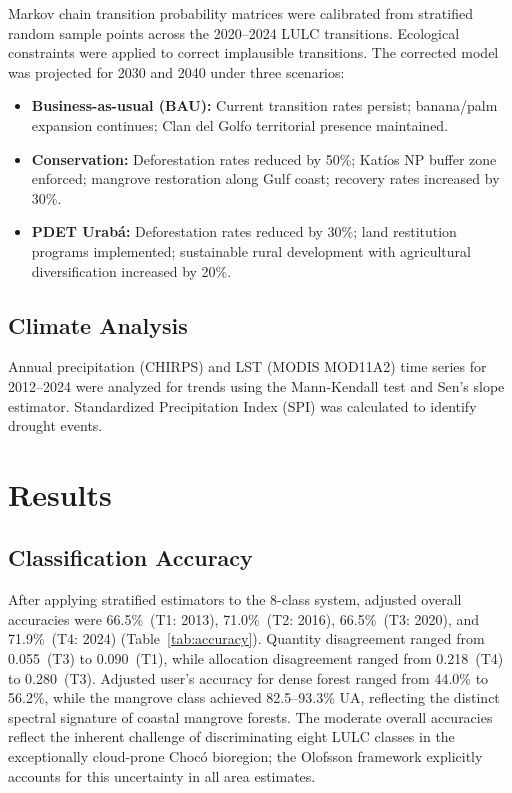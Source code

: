 \documentclass[12pt,a4paper]{article}
\begin{document}
Markov chain transition probability matrices \citep{Halmy2015} were calibrated from stratified random sample points across the 2020--2024 LULC transitions. Ecological constraints were applied to correct implausible transitions. The corrected model was projected for 2030 and 2040 under three scenarios:

\begin{itemize}
\item \textbf{Business-as-usual (BAU):} Current transition rates persist; banana/palm expansion continues; Clan del Golfo territorial presence maintained.
\item \textbf{Conservation:} Deforestation rates reduced by 50\%; Kat\'{i}os NP buffer zone enforced; mangrove restoration along Gulf coast; recovery rates increased by 30\%.
\item \textbf{PDET Urab\'{a}:} Deforestation rates reduced by 30\%; land restitution programs implemented; sustainable rural development with agricultural diversification increased by 20\%.
\end{itemize}

\subsection{Climate Analysis}

Annual precipitation (CHIRPS) and LST (MODIS MOD11A2) time series for 2012--2024 were analyzed for trends using the Mann-Kendall test and Sen's slope estimator. Standardized Precipitation Index (SPI) was calculated to identify drought events.


\section{Results}

\subsection{Classification Accuracy}

After applying \citet{Olofsson2014} stratified estimators to the 8-class system, adjusted overall accuracies were 66.5\%~(T1: 2013), 71.0\%~(T2: 2016), 66.5\%~(T3: 2020), and 71.9\%~(T4: 2024) (Table~\ref{tab:accuracy}). Quantity disagreement ranged from 0.055~(T3) to 0.090~(T1), while allocation disagreement ranged from 0.218~(T4) to 0.280~(T3). Adjusted user's accuracy for dense forest ranged from 44.0\% to 56.2\%, while the mangrove class achieved 82.5--93.3\% UA, reflecting the distinct spectral signature of coastal mangrove forests. The moderate overall accuracies reflect the inherent challenge of discriminating eight LULC classes in the exceptionally cloud-prone Choc\'{o} bioregion; the Olofsson framework explicitly accounts for this uncertainty in all area estimates.
\end{document}

